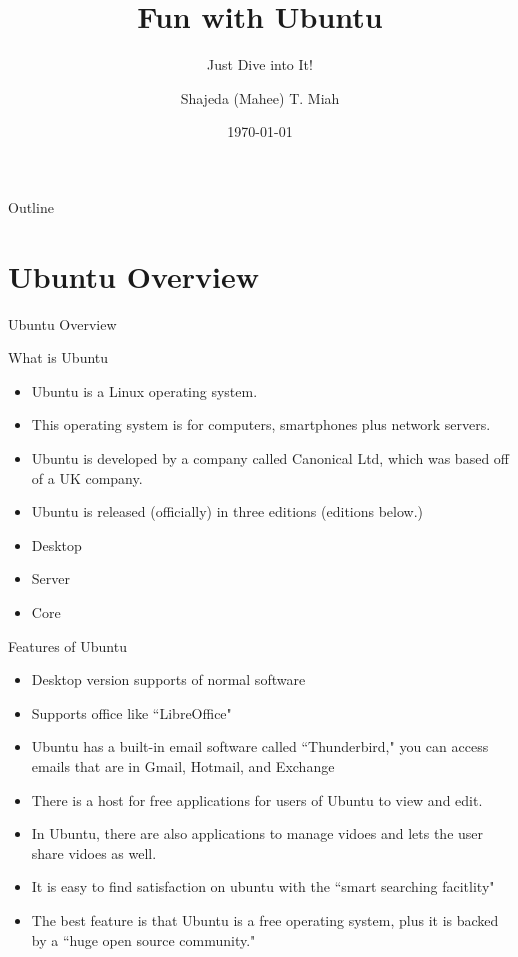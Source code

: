 \documentclass[aspectratio=43]{beamer}
\title{Fun with Ubuntu} %
\subtitle{Just Dive into It!}
\author[S. T. Miah]{Shajeda (Mahee) T. Miah}
\institute[HGES]{
    Fifth Grade%
    \\
    Hickory Grove Elementary School%
    \\
    ~\\
    2514 W Hickory Grove Rd, Dunlap, IL 61525\\
    UNITED STATES
} %
\date{\today}
\begin{document}
    
    \frame{\titlepage}
    
    \begin{frame}{Outline}
        \tableofcontents
    \end{frame}

	\section{Ubuntu Overview}
			
	\begin{frame}{Ubuntu Overview}

\begin{block}{What is Ubuntu}
	\begin{itemize}
	\item  Ubuntu is a Linux operating system. 
	\item This operating system is for computers, smartphones plus network servers.
	\item Ubuntu is developed by a company called Canonical Ltd, which was based off of a UK company.
	\item Ubuntu is released (officially) in three editions (editions below.)
	
	\item Desktop
	\item Server
	\item Core
	\end{itemize}		
\end{block}
\end{frame}		
	
\begin{frame}{Features of Ubuntu}
\begin{itemize}
\item Desktop version supports of normal software 

\item Supports office like ``LibreOffice"

\item Ubuntu has a built-in email software called ``Thunderbird," you can access emails that are in Gmail, Hotmail, and Exchange

\item There is a host for free applications for users of Ubuntu to view and edit.

\item In Ubuntu, there are also applications to manage vidoes and lets the user share vidoes as well.

\item It is easy to find satisfaction on ubuntu with the ``smart searching facitlity"

\item The best feature is that Ubuntu is a free operating system, plus it is backed by a ``huge open source community."


\end{itemize}


\end{frame}	
\end{document}
